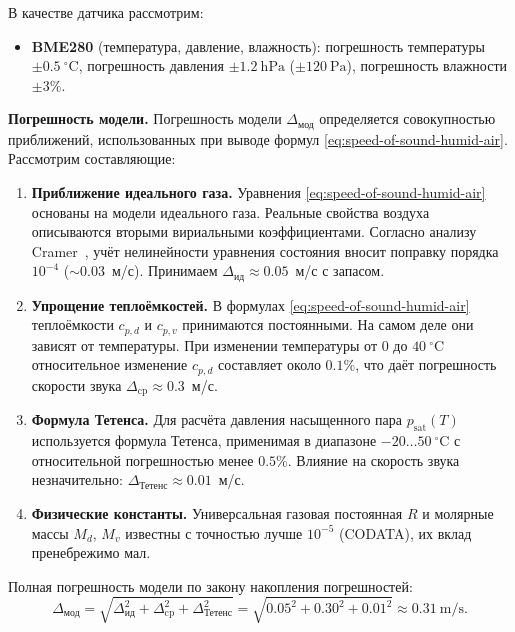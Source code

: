 \documentclass[a4paper,11pt]{article} %
\begin{document}
В качестве датчика рассмотрим:
\begin{itemize}
    \item \textbf{BME280} (температура, давление, влажность): погрешность температуры $\pm 0.5\ ^\circ\mathrm{C}$, погрешность давления $\pm 1.2\ \mathrm{hPa}$ ($\pm 120\ \mathrm{Pa}$), погрешность влажности $\pm 3\%$.
\end{itemize}

\textbf{Погрешность модели.}
Погрешность модели $\Delta_{\text{мод}}$ определяется совокупностью приближений, использованных при выводе формул \eqref{eq:speed-of-sound-humid-air}. Рассмотрим составляющие:

\begin{enumerate}
    \item \textbf{Приближение идеального газа.} Уравнения \eqref{eq:speed-of-sound-humid-air} основаны на модели идеального газа.
    Реальные свойства воздуха описываются вторыми вириальными коэффициентами. Согласно анализу Cramer~\cite{cramer1993}, 
    учёт нелинейности уравнения состояния вносит поправку порядка $10^{-4}$ ($\sim 0.03$~м/с). Принимаем $\Delta_{\text{ид}} \approx 0.05$~м/с с запасом.
    
    \item \textbf{Упрощение теплоёмкостей.} В формулах \eqref{eq:speed-of-sound-humid-air} теплоёмкости $c_{p,d}$ и $c_{p,v}$ 
    принимаются постоянными. На самом деле они зависят от температуры. При изменении температуры от 0 до $40\ ^\circ\mathrm{C}$ 
    относительное изменение $c_{p,d}$ составляет около $0.1\%$, что даёт погрешность скорости звука $\Delta_{\text{cp}} \approx 0.3$~м/с.
  
    \item \textbf{Формула Тетенса.} Для расчёта давления насыщенного пара $p_{\mathrm{sat}}(T)$ используется формула Тетенса, 
    применимая в диапазоне $-20\ldots 50\ ^\circ\mathrm{C}$ с относительной погрешностью менее $0.5\%$. 
    Влияние на скорость звука незначительно: $\Delta_{\text{Тетенс}} \approx 0.01$~м/с.
    
    \item \textbf{Физические константы.} Универсальная газовая постоянная $R$ и молярные массы $M_d$, $M_v$ известны 
    с точностью лучше $10^{-5}$ (CODATA), их вклад пренебрежимо мал.
\end{enumerate}


Полная погрешность модели по закону накопления погрешностей:
\begin{equation}\label{eq:model-error}
    \Delta_{\text{мод}} = \sqrt{\Delta_{\text{ид}}^2 + \Delta_{\text{cp}}^2 + \Delta_{\text{Тетенс}}^2} = \sqrt{0.05^2 + 0.30^2 + 0.01^2} \approx 0.31\ \mathrm{m/s}.
\end{equation}
\end{document}
